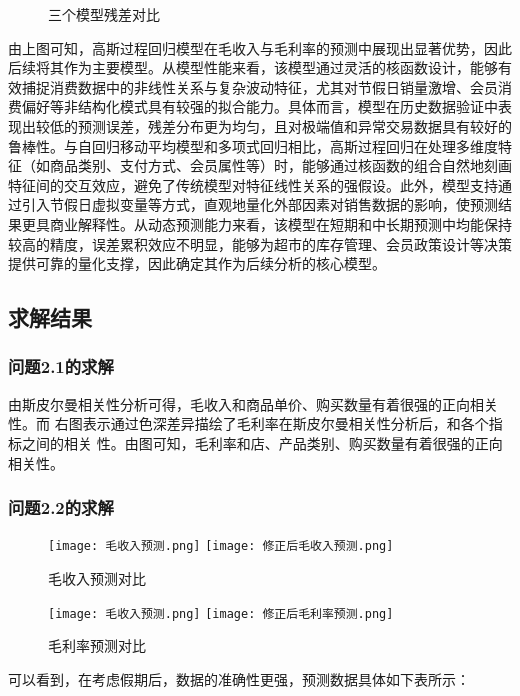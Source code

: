 \documentclass[withoutpreface,bwprint]{cumcmthesis}
\begin{document}
\begin{itemize}
\begin{figure}[H]
    \caption{三个模型残差对比}\label{fig:双图}
    \end{figure} 
    由上图可知，高斯过程回归模型在毛收入与毛利率的预测中展现出显著优势，因此后续将其作为主要模型。从模型性能来看，该模型通过灵活的核函数设计，能够有效捕捉消费数据中的非线性关系与复杂波动特征，尤其对节假日销量激增、会员消费偏好等非结构化模式具有较强的拟合能力。具体而言，模型在历史数据验证中表现出较低的预测误差，残差分布更为均匀，且对极端值和异常交易数据具有较好的鲁棒性。与自回归移动平均模型和多项式回归相比，高斯过程回归在处理多维度特征（如商品类别、支付方式、会员属性等）时，能够通过核函数的组合自然地刻画特征间的交互效应，避免了传统模型对特征线性关系的强假设。此外，模型支持通过引入节假日虚拟变量等方式，直观地量化外部因素对销售数据的影响，使预测结果更具商业解释性。从动态预测能力来看，该模型在短期和中长期预测中均能保持较高的精度，误差累积效应不明显，能够为超市的库存管理、会员政策设计等决策提供可靠的量化支撑，因此确定其作为后续分析的核心模型。
    \end{itemize}
\par

\subsection{求解结果}

\subsubsection{问题2.1的求解}
由斯皮尔曼相关性分析可得，毛收入和商品单价、购买数量有着很强的正向相关性。而
右图表示通过色深差异描绘了毛利率在斯皮尔曼相关性分析后，和各个指标之间的相关
性。由图可知，毛利率和店、产品类别、购买数量有着很强的正向相关性。

\subsubsection{问题2.2的求解}

\begin{figure}[H]
\centering
{}
{\texttt{[image: 毛收入预测.png]}}
{\texttt{[image: 修正后毛收入预测.png]}}
\caption{毛收入预测对比}\label{fig:双图}
\end{figure} 

\begin{figure}[H]
\centering
{}
{\texttt{[image: 毛收入预测.png]}}
{\texttt{[image: 修正后毛利率预测.png]}}
\caption{毛利率预测对比}\label{fig:双图}
\end{figure} 
可以看到，在考虑假期后，数据的准确性更强，预测数据具体如下表所示：
\end{document}
